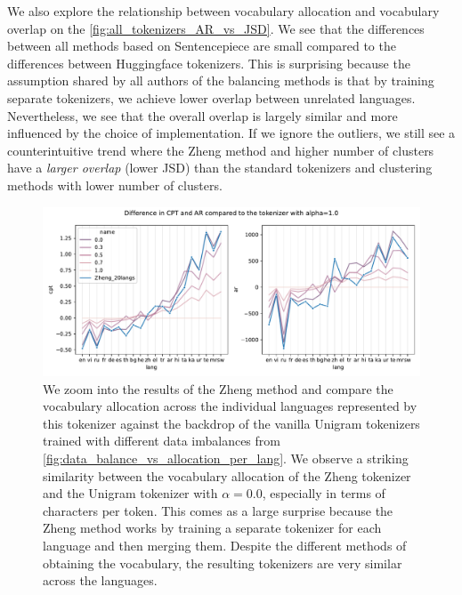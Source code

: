 We also explore the relationship between vocabulary allocation and vocabulary overlap on the \autoref{fig:all_tokenizers_AR_vs_JSD}. We see that the differences between all methods based on Sentencepiece are small compared to the differences between Huggingface tokenizers. This is surprising because the assumption shared by all authors of the balancing methods is that by training separate tokenizers, we achieve lower overlap between unrelated languages. Nevertheless, we see that the overall overlap is largely similar and more influenced by the choice of implementation. If we ignore the outliers, we still see a counterintuitive trend where the Zheng method and higher number of clusters have a \textit{larger overlap} (lower JSD) than the standard tokenizers and clustering methods with lower number of clusters.

\begin{figure}
    \centering
    \includegraphics[width=\textwidth]{figures/zheng_vs_alphas.pdf}
    \caption{We zoom into the results of the Zheng method and compare the vocabulary allocation across the individual languages represented by this tokenizer against the backdrop of the vanilla Unigram tokenizers trained with different data imbalances from \ref{fig:data_balance_vs_allocation_per_lang}. We observe a striking similarity between the vocabulary allocation of the Zheng tokenizer and the Unigram tokenizer with $\alpha=0.0$, especially in terms of characters per token. This comes as a large surprise because the Zheng method works by training a separate tokenizer for each language and then merging them. Despite the different methods of obtaining the vocabulary, the resulting tokenizers are very similar across the languages.}
    \label{fig:zheng_vs_alphas}
\end{figure}

